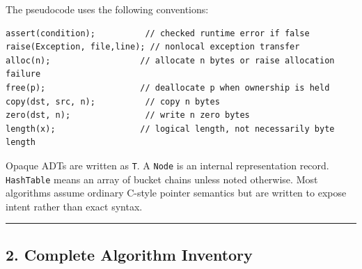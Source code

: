 \documentclass[11pt]{article}
\begin{document}
The pseudocode uses the following conventions:

\begin{verbatim}
assert(condition);          // checked runtime error if false
raise(Exception, file,line); // nonlocal exception transfer
alloc(n);                  // allocate n bytes or raise allocation failure
free(p);                   // deallocate p when ownership is held
copy(dst, src, n);          // copy n bytes
zero(dst, n);               // write n zero bytes
length(x);                 // logical length, not necessarily byte length
\end{verbatim}

Opaque ADTs are written as \texttt{T}. A \texttt{Node} is an internal representation record. \texttt{HashTable} means an array of bucket chains unless noted otherwise. Most algorithms assume ordinary C-style pointer semantics but are written to expose intent rather than exact syntax.

\begin{center}\rule{0.5\linewidth}{0.5pt}\end{center}

\subsection{2. Complete Algorithm Inventory}\label{complete-algorithm-inventory}
\end{document}
